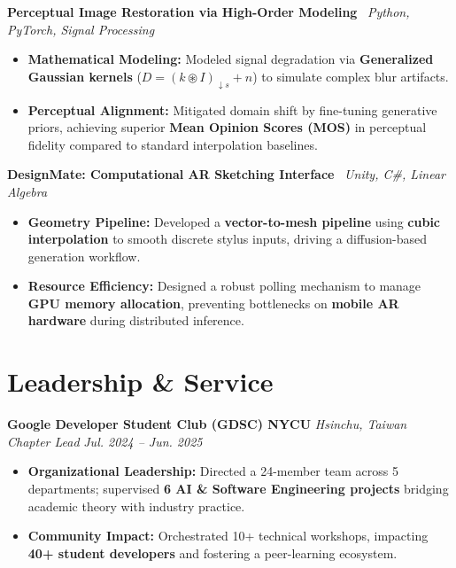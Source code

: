 \documentclass[10pt,letterpaper]{article}
\newenvironment{hangitems}{%
  \begin{itemize}[leftmargin=1.6em,labelsep=0.4em,topsep=2pt,itemsep=2pt,parsep=0pt]
}{%
  \end{itemize}
}
\begin{document}
\noindent
\textbf{Perceptual Image Restoration via High-Order Modeling} \textbar\ \textit{Python, PyTorch, Signal Processing} \href{https://drive.google.com/file/d/1fBnnYI-fNtZLZinE3pLgckEplOXt6KaH/view}{\footnotesize{}}
\begin{hangitems}
    \item \textbf{Mathematical Modeling:} Modeled signal degradation via \textbf{Generalized Gaussian kernels} ($D = (k \circledast I)_{\downarrow s} + n$) to simulate complex blur artifacts.
    \item \textbf{Perceptual Alignment:} Mitigated domain shift by fine-tuning generative priors, achieving superior \textbf{Mean Opinion Scores (MOS)} in perceptual fidelity compared to standard interpolation baselines.
\end{hangitems}

\noindent
\textbf{DesignMate: Computational AR Sketching Interface} \textbar\ \textit{Unity, C\#, Linear Algebra} \href{https://github.com/LinyangAndFriends/DesignMate}{\footnotesize{}}
\begin{hangitems}
    \item \textbf{Geometry Pipeline:} Developed a \textbf{vector-to-mesh pipeline} using \textbf{cubic interpolation} to smooth discrete stylus inputs, driving a diffusion-based generation workflow.
    \item \textbf{Resource Efficiency:} Designed a robust polling mechanism to manage \textbf{GPU memory allocation}, preventing bottlenecks on \textbf{mobile AR hardware} during distributed inference.
\end{hangitems}

\section*{Leadership \& Service}

\noindent
\textbf{Google Developer Student Club (GDSC) NYCU} \hfill \textit{Hsinchu, Taiwan}\\
\textit{Chapter Lead} \hfill \textit{Jul. 2024 – Jun. 2025}
\begin{hangitems}
    \item \textbf{Organizational Leadership:} Directed a 24-member team across 5 departments; supervised \textbf{6 AI \& Software Engineering projects} bridging academic theory with industry practice.
    \item \textbf{Community Impact:} Orchestrated 10+ technical workshops, impacting \textbf{40+ student developers} and fostering a peer-learning ecosystem.
\end{hangitems}
\end{document}

